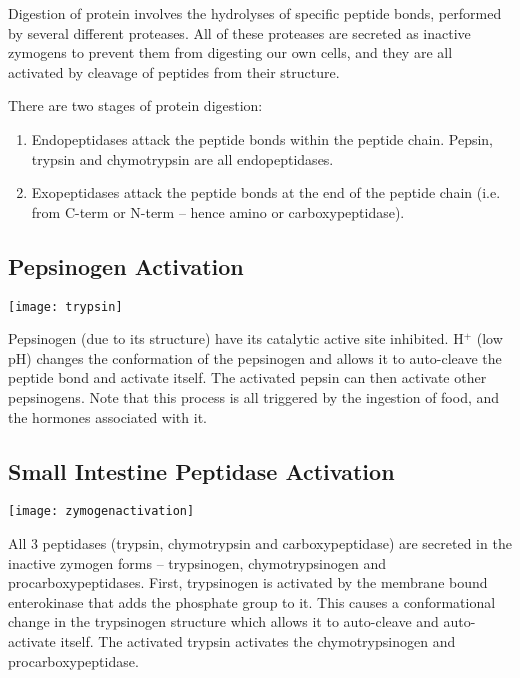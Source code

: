 Digestion of protein involves the hydrolyses of specific peptide bonds, performed by several different proteases.
All of these proteases are secreted as inactive zymogens to prevent them from digesting our own cells, and they are all activated by cleavage of peptides from their structure.

There are two stages of protein digestion:
\begin{enumerate}
\item Endopeptidases attack the peptide bonds within the peptide chain. Pepsin, trypsin and chymotrypsin are all endopeptidases.
\item Exopeptidases attack the peptide bonds at the end of the peptide chain (i.e. from C-term or N-term -- hence amino or carboxypeptidase).
\end{enumerate}

\subsection{Pepsinogen Activation}

\begin{center}
\texttt{[image: trypsin]}
\end{center}

Pepsinogen (due to its structure) have its catalytic active site inhibited.
H$^+$ (low pH) changes the conformation of the pepsinogen and allows it to auto-cleave the peptide bond and activate itself.
The activated pepsin can then activate other pepsinogens.
Note that this process is all triggered by the ingestion of food, and the hormones associated with it.

\subsection{Small Intestine Peptidase Activation}

\begin{center}
\texttt{[image: zymogenactivation]}
\end{center}

All 3 peptidases (trypsin, chymotrypsin and carboxypeptidase) are secreted in the inactive zymogen forms -- trypsinogen, chymotrypsinogen and procarboxypeptidases.
First, trypsinogen is activated by the membrane bound enterokinase that adds the phosphate group to it.
This causes a conformational change in the trypsinogen structure which allows it to auto-cleave and auto-activate itself.
The activated trypsin activates the chymotrypsinogen and procarboxypeptidase.

